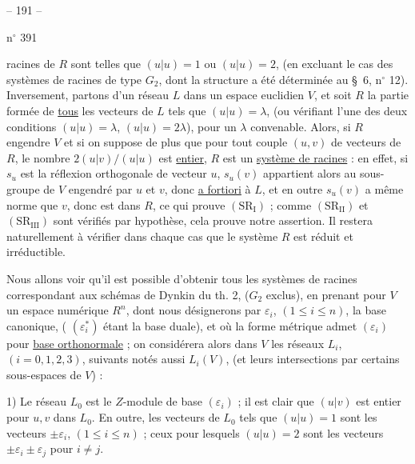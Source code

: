 
\begin{center}-- 191 --\end{center}
\hfill n$^{\circ}$ 391

racines de $R$ sont telles que $(u|u)=1$ ou $(u|u)=2$, (en excluant le cas des
systèmes de racines de type $G_2$, dont la structure a été déterminée au \S\ 6, n$^{\circ}$ 12).
Inversement, partons d'un réseau $L$ dans un espace euclidien $V$, et soit $R$ la
partie formée de \uline{tous} les vecteurs de $L$ tels que $(u|u)=\lambda$, (ou vérifiant l'une
des deux conditions $(u|u)=\lambda$, $(u|u)=2\lambda$), pour un $\lambda$ convenable. Alors,
si $R$ engendre $V$ et si on suppose de plus que pour tout couple $(u,v)$ de vecteurs
de $R$, le nombre $2(u|v)/(u|u)$ est \uline{entier}, $R$ est un \uline{système de racines} : en effet,
si $s_u$ est la réflexion orthogonale de vecteur $u$, $s_u(v)$ appartient alors au sous-groupe
de $V$ engendré par $u$ et $v$, donc \uline{a fortiori} à $L$, et en outre $s_u(v)$ a même
norme que $v$, donc est dans $R$, ce qui prouve $(\mathrm{SR}_{\mathrm I})$ ; comme
$(\mathrm{SR}_{\mathrm{II}})$ et $(\mathrm{SR}_{\mathrm{III}})$ sont
vérifiés par hypothèse, cela prouve notre assertion. Il restera naturellement
à vérifier dans chaque cas que le système $R$ est réduit et irréductible.

Nous allons voir qu'il est possible d'obtenir tous les systèmes de racines
correspondant aux schémas de Dynkin du th. 2, ($G_2$ exclus), en prenant pour $V$ un
espace numérique $R^n$, dont nous désignerons par $\varepsilon_i$, $(1\leq i\leq n)$, la base canonique,
( $(\varepsilon_i^*)$ étant la base duale), et où la forme métrique admet $(\varepsilon_i)$ pour
\uline{base orthonormale} ; on considérera alors dans $V$ les réseaux $L_i$, $(i=0,1,2,3)$,
suivants notés aussi $L_i(V)$, (et leurs intersections par certains sous-espaces
de $V$) :

1) Le réseau $L_0$ est le $Z$-module de base $(\varepsilon_i)$ ; il est clair que $(u|v)$ est
entier pour $u,v$ dans $L_0$. En outre, les vecteurs de $L_0$ tels que $(u|u)=1$ sont
les vecteurs $\pm\varepsilon_i$, $(1\leq i\leq n)$ ; ceux pour lesquels $(u|u)=2$ sont les vecteurs
$\pm\varepsilon_i\pm\varepsilon_j$ pour $i\ne j$.

